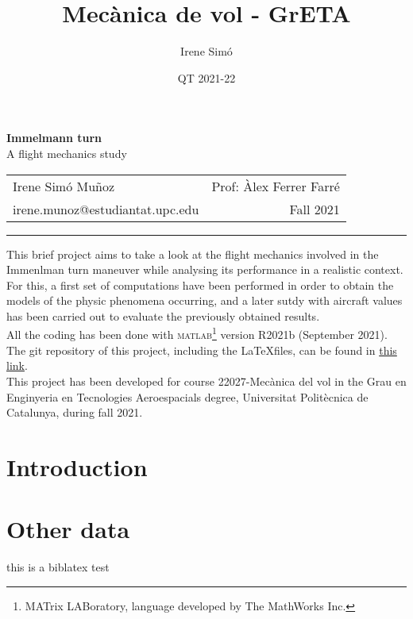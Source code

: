 \documentclass[10pt, twoside]{report}
\title{Mecànica de vol - GrETA}
\author{Irene Simó}
\date{QT 2021-22}
\begin{document}
\thispagestyle{empty} 
	\begin{center}
	\LARGE \textbf{Immelmann turn}\\
	\Large A flight mechanics study\\
		\normalsize
	\begin{tabularx}{\textwidth}{l r}
		Irene Simó Muñoz & Prof: Àlex Ferrer Farré\\
		irene.munoz@estudiantat.upc.edu & Fall 2021
	\end{tabularx}

	\hrule
	\end{center}
	This brief project aims to take a look at the flight mechanics involved in the Immenlman turn maneuver while analysing its performance in a realistic context. \\ For this, a first set of computations have been performed in order to obtain the models of the physic phenomena occurring, and a later sutdy with aircraft values has been carried out to evaluate the previously obtained results.\\
	All the coding has been done with \textsc{matlab}\footnote{MATrix LABoratory, language developed by The MathWorks Inc.} version R2021b (September 2021). The git repository of this project, including the \LaTeX files, can be found in \hyperlink{https://github.com/isimo00/immelmann-turn}{this link}.\\
	This project has been developed for course 22027-Mecànica del vol in the Grau en Enginyeria en Tecnologies Aeroespacials degree, Universitat Politècnica de Catalunya, during fall 2021.
	
	\begin{multicols}{2}
	\vspace*{-2cm}
	\tableofcontents
	\section*{Introduction}
	
		
	

	
	\section*{Other data}
	this is a biblatex test \cite{tierno}
	\end{multicols}\clearpage

\listoffigures
\clearpage
\appendix

\end{document}
